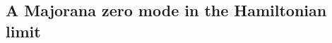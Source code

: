 \documentclass[11pt]{article}
\newcommand{\D}{{\mathcal{D}}}
\newcommand{\T}{{{\cal T}}} %
\numberwithin{equation}{section}		%
\begin{document}









\subsection{A Majorana zero mode in the Hamiltonian limit}
\label{sec:Majorana}
\end{document}
